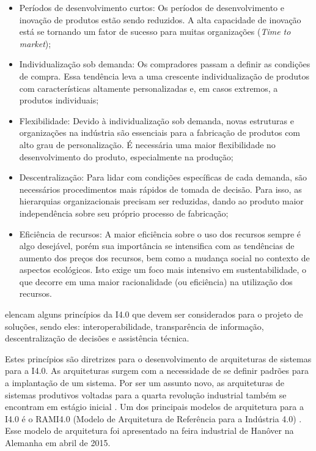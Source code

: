 \begin{itemize}

	\item Períodos de desenvolvimento curtos: Os períodos de desenvolvimento e inovação de produtos estão sendo reduzidos. A alta capacidade de inovação está se tornando um fator de sucesso para muitas organizações (\textit{Time to market});

	\item Individualização sob demanda: Os compradores passam a definir as condições de compra. Essa tendência leva a uma crescente individualização de produtos com características altamente personalizadas e, em casos extremos, a produtos individuais;

	\item Flexibilidade: Devido à individualização sob demanda, novas estruturas e organizações na indústria são essenciais para a fabricação de produtos com alto grau de personalização. É necessária uma maior flexibilidade no desenvolvimento do produto, especialmente na produção;

	\item Descentralização: Para lidar com condições específicas de cada demanda, são necessários procedimentos mais rápidos de tomada de decisão. Para isso, as hierarquias organizacionais precisam ser reduzidas, dando ao produto maior independência sobre seu próprio processo de fabricação;

	\item Eficiência de recursos: A maior eficiência sobre o uso dos recursos sempre é algo desejável, porém sua importância se intensifica com as tendências de aumento dos preços dos recursos, bem como a mudança social no contexto de aspectos ecológicos. Isto exige um foco mais intensivo em sustentabilidade, o que decorre em uma maior racionalidade (ou eficiência) na utilização dos recursos.

\end{itemize}

 elencam alguns princípios da I4.0 que devem ser considerados para o projeto de soluções, sendo eles: interoperabilidade, transparência de informação, descentralização de decisões e assistência técnica.

Estes princípios são diretrizes para o desenvolvimento de arquiteturas de sistemas para a I4.0. As arquiteturas surgem com a necessidade de se definir padrões para a implantação de um sistema. Por ser um assunto novo, as arquiteturas de sistemas produtivos voltadas para a quarta revolução industrial também se encontram em estágio inicial \cite{pisching2018arquitetura}. Um dos principais modelos de arquitetura para a I4.0 é o RAMI4.0 (Modelo de Arquitetura de Referência para a Indústria 4.0) \cite{hankel2015rami}. Esse modelo de arquitetura foi apresentado na feira industrial de Hanôver na Alemanha em abril de 2015.

